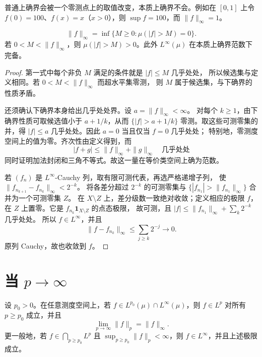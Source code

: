 普通上确界会被一个零测点上的取值改变，本质上确界不会。例如在
\([0,1]\) 上令 \(f(0)=100\)、\(f(x)=x\)（\(x>0\)），则
\(\sup f=100\)，而 \(\|f\|_\infty=1\)。

\begin{proposition}
\label{prop:essential-sup-levels}
\[
 \|f\|_\infty
 =\inf\{M\ge0:\mu(|f|>M)=0\}.
\]
若 \(0<M<\|f\|_\infty\)，则 \(\mu(|f|>M)>0\)。此外
\(L^\infty(\mu)\) 在本质上确界范数下完备。
\end{proposition}

\begin{proof}
第一式中每个非负 \(M\) 满足的条件就是 \(|f|\le M\) 几乎处处，
所以候选集与定义相同。若 \(0<M<\|f\|_\infty\) 而超水平集零测，
则 \(M\) 属于候选集，与下确界的性质矛盾。

还须确认下确界本身给出几乎处处界。设 \(a=\|f\|_\infty<\infty\)。
对每个 \(k\ge1\)，由下确界性质可取候选值小于 \(a+1/k\)，从而
\(\{|f|>a+1/k\}\) 零测。取这些可测零集的并，得
\(|f|\le a\) 几乎处处。因此 \(a=0\) 当且仅当 \(f=0\) 几乎处处；
特别地，零测度空间上的值为零。齐次性由定义得到，而
\[
 |f+g|\le\|f\|_\infty+\|g\|_\infty\quad\text{几乎处处}
\]
同时证明加法封闭和三角不等式。故这一量在等价类空间上确为范数。

若 \((f_n)\) 是 \(L^\infty\)-Cauchy 列，取有限可测代表，再选严格递增子列，
使 \(\|f_{n_{k+1}}-f_{n_k}\|_\infty<2^{-k}\)。
将各差分超过 \(2^{-k}\) 的可测零集与
\(\{|f_{n_1}|>\|f_{n_1}\|_\infty\}\) 合并为一个可测零集 \(Z\)。
在 \(X\setminus Z\) 上，差分级数一致绝对收敛；定义相应的极限 \(f\)，
在 \(Z\) 上置零。它是 \(f_{n_k}\mathbf1_{X\setminus Z}\) 的点态极限，
故可测，且 \(|f|\le\|f_{n_1}\|_\infty+\sum_k2^{-k}\) 几乎处处。
所以 \(f\in L^\infty\)，并且
\[
 \|f-f_{n_k}\|_\infty\le\sum_{j\ge k}2^{-j}\to0.
\]
原列 Cauchy，故也收敛到 \(f\)。
\end{proof}

\section{当 \texorpdfstring{\(p\to\infty\)}{p tends to infinity}}

\begin{theorem}
\label{thm:lp-limit-linfty}
设 \(p_0>0\)。在任意测度空间上，若
\(f\in L^{p_0}(\mu)\cap L^\infty(\mu)\)，则 \(f\in L^p\) 对所有
\(p\ge p_0\) 成立，并且
\[
 \lim_{p\to\infty}\|f\|_p=\|f\|_\infty.
\]
更一般地，若 \(f\in\bigcap_{p\ge p_0}L^p\) 且
\(\sup_{p\ge p_0}\|f\|_p<\infty\)，则 \(f\in L^\infty\)，并且上述极限
成立。
\end{theorem}

